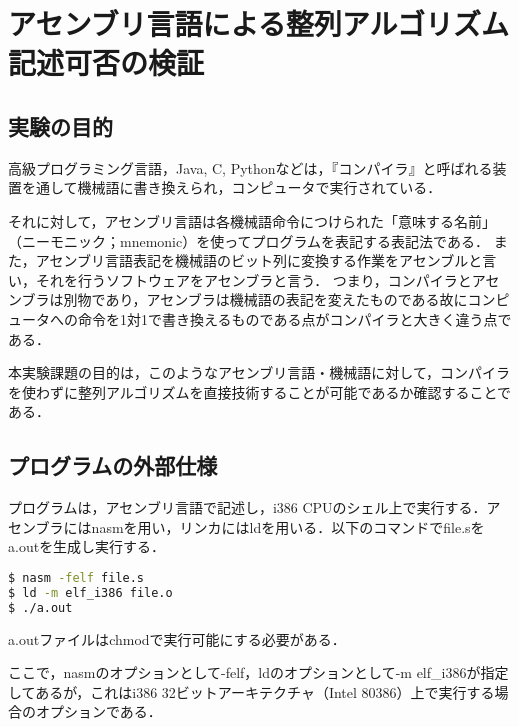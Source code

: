 \section{アセンブリ言語による整列アルゴリズム記述可否の検証}
\subsection{実験の目的}
高級プログラミング言語，{\ttfamily Java, C, Python}などは，『コンパイラ』と呼ばれる装置を通して機械語に書き換えられ，コンピュータで実行されている．\par
それに対して，アセンブリ言語は各機械語命令につけられた「意味する名前」（ニーモニック；mnemonic）を使ってプログラムを表記する表記法である．\cite{pl2text}
また，アセンブリ言語表記を機械語のビット列に変換する作業をアセンブルと言い，それを行うソフトウェアをアセンブラと言う．
つまり，コンパイラとアセンブラは別物であり，アセンブラは機械語の表記を変えたものである故にコンピュータへの命令を1対1で書き換えるものである点がコンパイラと大きく違う点である．\par
本実験課題の目的は，このようなアセンブリ言語・機械語に対して，コンパイラを使わずに整列アルゴリズムを直接技術することが可能であるか確認することである．
\subsection{プログラムの外部仕様}
プログラムは，アセンブリ言語で記述し，i386 CPUのシェル上で実行する．アセンブラには{\ttfamily nasm}を用い，リンカには{\ttfamily ld}を用いる．以下のコマンドで{\ttfamily file.s}を{\ttfamily a.out}を生成し実行する．
\begin{lstlisting}[language={Bash},numbers = {none},frame = {single}]
$ nasm -felf file.s
$ ld -m elf_i386 file.o
$ ./a.out
    \end{lstlisting}
{\ttfamily a.out}ファイルは{\ttfamily chmod}で実行可能にする必要がある．\par
ここで，{\ttfamily nasm}のオプションとして{\ttfamily -felf}，{\ttfamily ld}のオプションとして{\ttfamily -m elf\_i386}が指定してあるが，これはi386 32ビットアーキテクチャ（Intel 80386）上で実行する場合のオプションである．
